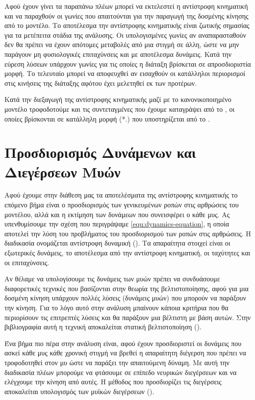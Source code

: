Αφού έχουν γίνει τα παραπάνω πλέων μπορεί να εκτελεστεί η αντίστροφη κινηματική και να παραχθούν οι γωνίες που απαιτούνται για την παραγωγή της δοσμένης κίνησης από το μοντέλο. Το αποτέλεσμα την αντίστροφης κινηματικής είναι ζωτικής σημασίας για τα μετέπειτα στάδια της ανάλυσης. Οι υπολογισμένες γωνίες αν αναπαρασταθούν δεν θα πρέπει να έχουν απότομες μεταβολές από μια στιγμή σε άλλη, ώστε να μην παράγουν μη φυσιολογικές επιταχύνσεις και με αποτέλεσμα δυνάμεις. Κατά την εύρεση λύσεων υπάρχουν γωνίες για τις οποίες η διάταξη βρίσκεται σε απροσδιοριστία μορφή. Το τελευταίο μπορεί να αποφευχθεί αν εισαχθούν οι κατάλληλοι περιορισμοί στις κινήσεις της διάταξης αφότου έχει μελετηθεί εκ των προτέρων.

Κατά την διεξαγωγή της αντίστροφης κινηματικής μαζί με το κανονικοποιημένο μοντέλο τροφοδοτούμε και τις συντεταγμένες που έχουμε καταγράψει από το , οι οποίες βρίσκονται σε κατάλληλη μορφή (*.) που υποστηρίζεται από το .

\section{Προσδιορισμός Δυνάμενων και Διεγέρσεων Μυών}

Αφού έχουμε στην διάθεση μας τα αποτελέσματα της αντίστροφης κινηματικής το επόμενο βήμα είναι ο προσδιορισμός των γενικευμένων ροπών στις αρθρώσεις του μοντέλου, αλλά και η εκτίμηση των δυνάμεων που συνεισφέρει ο κάθε μυς. Ας υπενθυμίσουμε την σχέση που περιγράψαμε \ref{equ:dynamics-equation}, η οποία αποτελεί την λύση του προβλήματος του προσδιορισμού των ροπών στις αρθρώσεις. Η διαδικασία ονομάζεται αντίστροφη δυναμική (). Τα απαραίτητα στοιχεί είναι οι εξωτερικές δυνάμεις, το αποτέλεσμα από την αντίστροφη κινηματική, οι ταχύτητες και οι επιταχύνσεις.

Αν θέλαμε να υπολογίσουμε τις δυνάμεις των μυών πρέπει να συνδυάσουμε διαφορετικές τεχνικές που βασίζονται στην θεωρία της βελτιστοποίησης, αφού για μια δοσμένη κίνηση υπάρχουν πολλές λύσεις (δυνάμεις μυών) που μπορούν να παράξουν την κίνηση. Για το λόγο αυτό στην ανάλυση μπαίνουν κάποια κριτήρια που θα περιορίσουν τις επιτρεπτές λύσεις και θα παράξουν μια βέλτιστη με βάση αυτών. Στην βιβλιογραφία αυτή η τεχνική αποκαλείται στατική βελτιστοποίηση ().

Ένα βήμα πιο πέρα στην ανάλυση είναι, αφού έχουν προσδιοριστεί οι δυνάμεις που ασκεί κάθε μυς κάθε χρονική στιγμή να βρεθεί η απαραίτητη διέγερση που πρέπει να τροφοδοτηθεί στον μυ ώστε να παράξει την απαιτούμενη δύναμη. Με αυτή την διαδικασία πλέων μπορούμε να φτάσουμε σε επίπεδο νευρικών διεγέρσεων και να ελέγχουμε την κίνηση από αυτές. Η μέθοδος που προσδιορίζει τις διεγέρσεις αποκαλείται υπολογισμός των μυϊκών διεγέρσεων ().

